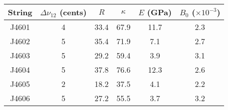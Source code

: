 \begin{tabular}{cccccc}
\toprule
String &  $\Delta \nu_{12}$ (cents) &  $R$ &  $\kappa$ &  $E$ (GPa) &  $B_0$ ($\times 10^{-3}$) \\
\midrule
 J4601 &                          4 & 33.4 &      67.9 &       11.7 &                       2.3 \\
 J4602 &                          5 & 35.4 &      71.9 &        7.1 &                       2.7 \\
 J4603 &                          5 & 29.2 &      59.4 &        3.9 &                       3.1 \\
 J4604 &                          5 & 37.8 &      76.6 &       12.3 &                       2.6 \\
 J4605 &                          2 & 18.2 &      37.5 &        4.1 &                       2.2 \\
 J4606 &                          5 & 27.2 &      55.5 &        3.7 &                       3.2 \\
\bottomrule
\end{tabular}

